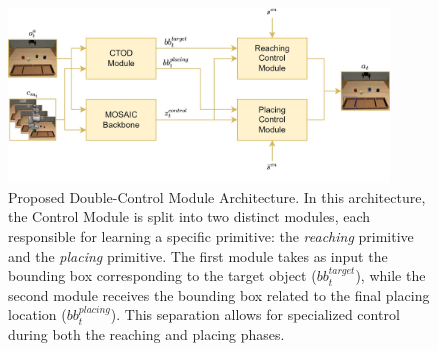 \begin{figure}[t]
    \centering
    \includegraphics[width=0.9\textwidth]{figures/images/ch3/double_control_module.jpg}
    \caption{Proposed Double-Control Module Architecture. In this architecture, the Control Module is split into two distinct modules, each responsible for learning a specific primitive: the \textit{reaching} primitive and the \textit{placing} primitive. The first module takes as input the bounding box corresponding to the target object ($bb^{target}_{t}$), while the second module receives the bounding box related to the final placing location ($bb^{placing}_{t}$). This separation allows for specialized control during both the reaching and placing phases.}
    \label{fig:double_control_module}
\end{figure}
